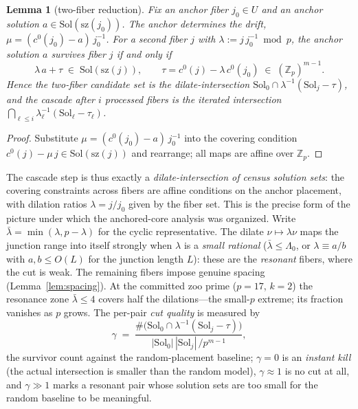 \documentclass[11pt,a4paper]{article}
\numberwithin{equation}{section}
\theoremstyle{plain}
\newtheorem{lemma}[theorem]{Lemma}
\theoremstyle{definition}
\theoremstyle{remark}
\newcommand{\Z}{\mathbb{Z}}
\begin{document}
\begin{lemma}[two-fiber reduction]\label{lem:twofiber}
Fix an anchor fiber $j_0\in U$ and an anchor solution
$a\in\mathrm{Sol}(\mathrm{sz}(j_0))$. The anchor determines the drift,
$\mu=(c^0(j_0)-a)\,j_0^{-1}$. For a second fiber $j$ with
$\lambda:=j\,j_0^{-1}\bmod p$, the anchor solution $a$ survives fiber
$j$ if and only if
\[
\lambda\,a+\tau\;\in\;\mathrm{Sol}(\mathrm{sz}(j)),
\qquad
\tau=c^0(j)-\lambda\,c^0(j_0)\;\in\;(\Z_p)^{m-1}.
\]
Hence the two-fiber candidate set is the dilate-intersection
$\mathrm{Sol}_0\cap\lambda^{-1}(\mathrm{Sol}_j-\tau)$, and the cascade
after $i$ processed fibers is the iterated intersection
$\bigcap_{\ell\le i}\lambda_\ell^{-1}(\mathrm{Sol}_\ell-\tau_\ell)$.
\end{lemma}

\begin{proof}
Substitute $\mu=(c^0(j_0)-a)\,j_0^{-1}$ into the covering condition
$c^0(j)-\mu\,j\in\mathrm{Sol}(\mathrm{sz}(j))$ and rearrange; all maps
are affine over $\Z_p$.
\end{proof}

The cascade step is thus exactly a \emph{dilate-intersection of census
solution sets}: the covering constraints across fibers are affine
conditions on the anchor placement, with dilation ratios
$\lambda=j/j_0$ given by the fiber set. This is the precise form of the
picture under which the anchored-core analysis was organized. Write
$\bar\lambda=\min(\lambda,p-\lambda)$ for the cyclic representative.
The dilate $\nu\mapsto\lambda\nu$ maps the junction range into itself
strongly when $\lambda$ is a \emph{small rational}
($\bar\lambda\le\Lambda_0$, or $\lambda\equiv a/b$ with $a,b\le O(L)$
for the junction length $L$): these are the \emph{resonant} fibers,
where the cut is weak. The remaining fibers impose genuine spacing
(Lemma~\ref{lem:spacing}). At the committed zoo prime ($p=17$, $k=2$)
the resonance zone $\bar\lambda\le 4$ covers half the dilations---the
small-$p$ extreme; its fraction vanishes as $p$ grows. The per-pair
\emph{cut quality} is measured by
\[
\gamma\;=\;\frac{\#\bigl(\mathrm{Sol}_0\cap\lambda^{-1}
(\mathrm{Sol}_j-\tau)\bigr)}
{|\mathrm{Sol}_0|\,|\mathrm{Sol}_j|\,/p^{m-1}},
\]
the survivor count against the random-placement baseline; $\gamma=0$ is
an \emph{instant kill} (the actual intersection is smaller than the
random model), $\gamma\approx 1$ is no cut at all, and $\gamma\gg 1$
marks a resonant pair whose solution sets are too small for the random
baseline to be meaningful.
\end{document}
